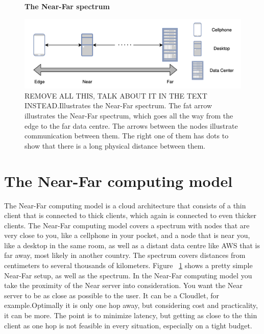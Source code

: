\begin{figure}[t]
    \centering
    \textbf{The Near-Far spectrum}\par\medskip
    \includegraphics[scale=0.6]{chapters/background/Near-far-spectrum.png}
    \caption{REMOVE ALL THIS, TALK ABOUT IT IN THE TEXT INSTEAD.Illustrates the Near-Far spectrum. The fat arrow illustrates the Near-Far spectrum, which goes all the way from the edge to the far data centre.  The arrows between the nodes illustrate communication between them. The right one of them has dots to show that there is a long physical distance between them.}
    \label{fig:nearFarSimple}
\end{figure}

\section{The Near-Far computing model}
The Near-Far computing model is a cloud architecture that consists of a thin client that is connected to thick clients, which again is connected to even thicker clients. The Near-Far computing model covers a spectrum with nodes that are very close to you, like a cellphone in your pocket, and a node that is near you, like a desktop in the same room, as well as a distant data centre like AWS that is far away, most likely in another country. The spectrum covers distances from centimeters to several thousands of kilometers. Figure ~\ref{fig:nearFarSimple} shows a pretty simple Near-Far setup, as well as the spectrum. In the Near-Far computing model you take the proximity of the Near server into consideration. You want the Near server to be as close as possible to the user. It can be a Cloudlet, for example.Optimally it is only one hop away, but considering cost and practicality, it can be more. The point is to minimize latency, but getting as close to the thin client as one hop is not feasible in every situation, especially on a tight budget.



